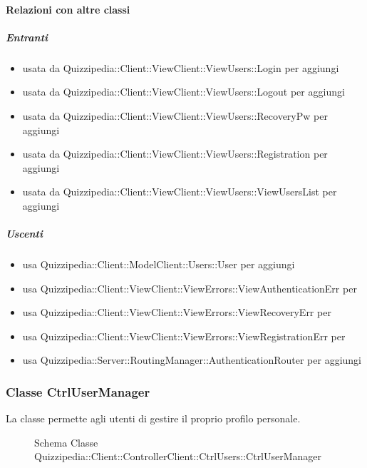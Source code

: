 \paragraph{Relazioni con altre classi}
\subparagraph{Entranti}
\begin{itemize}
\item usata da Quizzipedia::Client::ViewClient::ViewUsers::Login per aggiungi
\item usata da Quizzipedia::Client::ViewClient::ViewUsers::Logout per aggiungi
\item usata da Quizzipedia::Client::ViewClient::ViewUsers::RecoveryPw per aggiungi
\item usata da Quizzipedia::Client::ViewClient::ViewUsers::Registration per aggiungi
\item usata da Quizzipedia::Client::ViewClient::ViewUsers::ViewUsersList per aggiungi
\end{itemize}
\subparagraph{Uscenti}
\begin{itemize}
\item usa Quizzipedia::Client::ModelClient::Users::User per aggiungi
\item usa Quizzipedia::Client::ViewClient::ViewErrors::ViewAuthenticationErr per 
\item usa Quizzipedia::Client::ViewClient::ViewErrors::ViewRecoveryErr per 
\item usa Quizzipedia::Client::ViewClient::ViewErrors::ViewRegistrationErr per 
\item usa Quizzipedia::Server::RoutingManager::AuthenticationRouter per aggiungi
\end{itemize}
\subsubsection{Classe CtrlUserManager}
La classe permette agli utenti di gestire il proprio profilo personale.
\begin{figure}[H]
\centering
\noindent{}
\caption[Schema Classe CtrlUserManager]{Schema Classe Quizzipedia::Client::ControllerClient::CtrlUsers::CtrlUserManager}
\end{figure}

